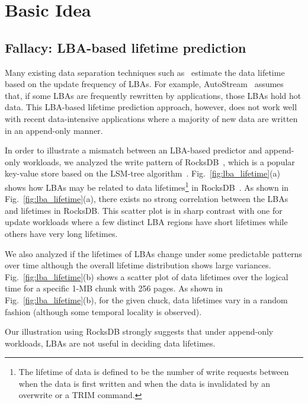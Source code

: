 \vspace{-13pt}
\section{Basic Idea}
\vspace{-5pt}
\subsection{Fallacy: LBA-based lifetime prediction}
Many existing data separation techniques such as~\cite{AutoStream, HotCold} 
estimate the data lifetime based on the update frequency of LBAs.  
For example, \textsf{\small AutoStream}~\cite{AutoStream} assumes that, if
some LBAs are frequently rewritten by applications, those LBAs hold hot data.
This LBA-based lifetime prediction 
approach, however, does not work well with recent data-intensive 
applications where a majority of
new data are written in an append-only manner.  



In order to illustrate a mismatch between an LBA-based predictor and 
append-only workloads, we analyzed the write pattern of 
RocksDB~\cite{RocksDB}, which is a
popular key-value store based on the LSM-tree algorithm~\cite{LSM}.
Fig.~\ref{fig:lba_lifetime}(a) shows how LBAs may be related 
to data lifetimes\footnote{The lifetime of data is defined to be 
the number of write requests between when the data is first written 
and when the data is invalidated by an overwrite or a TRIM command.}
in RocksDB~\cite{RocksDB}.  
As shown in Fig.~\ref{fig:lba_lifetime}(a), 
there exists no strong correlation between the LBAs and lifetimes in RocksDB.  
This scatter plot is in sharp contrast with one for update workloads 
where a few distinct LBA regions have short lifetimes while others 
have very long lifetimes.

We also analyzed 
if the lifetimes of LBAs change under some predictable patterns over time 
although the overall lifetime distribution shows large variances.
Fig.~\ref{fig:lba_lifetime}(b) shows a scatter plot of data lifetimes over the logical time 
for a specific 1-MB chunk with 256 pages. 
As shown in Fig.~\ref{fig:lba_lifetime}(b), 
for the given chuck, data lifetimes vary in a random fashion
(although some temporal locality is observed).

Our illustration using RocksDB strongly suggests that under append-only
workloads, LBAs are not useful in deciding data lifetimes.

